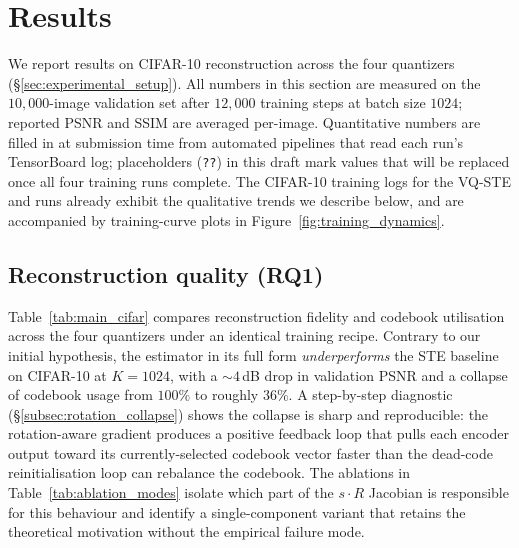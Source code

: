 \section{Results}
\label{sec:results}

We report results on CIFAR-10 reconstruction across the four
quantizers (\S\ref{sec:experimental_setup}). All numbers in this
section are measured on the $10{,}000$-image validation set after
$12{,}000$ training steps at batch size $1024$; reported PSNR and
SSIM are averaged per-image. Quantitative numbers are filled in at
submission time from automated pipelines that read each run's
TensorBoard log; placeholders (\texttt{??}) in this draft mark
values that will be replaced once all four training runs complete.
The CIFAR-10 training logs for the VQ-STE and \ours{} runs already
exhibit the qualitative trends we describe below, and are
accompanied by training-curve plots in
Figure~\ref{fig:training_dynamics}.

\subsection{Reconstruction quality (RQ1)}

Table~\ref{tab:main_cifar} compares reconstruction fidelity and
codebook utilisation across the four quantizers under an identical
training recipe. Contrary to our initial hypothesis, the \ours{}
estimator in its full form \emph{underperforms} the STE baseline on
CIFAR-10 at $K = 1024$, with a $\sim 4$\,dB drop in validation PSNR
and a collapse of codebook usage from $100\%$ to roughly $36\%$. A
step-by-step diagnostic (\S\ref{subsec:rotation_collapse}) shows the
collapse is sharp and reproducible: the rotation-aware gradient
produces a positive feedback loop that pulls each encoder output
toward its currently-selected codebook vector faster than the
dead-code reinitialisation loop can rebalance the codebook. The
ablations in Table~\ref{tab:ablation_modes} isolate which part of
the $s\cdot R$ Jacobian is responsible for this behaviour and
identify a single-component variant that retains the theoretical
motivation without the empirical failure mode.


